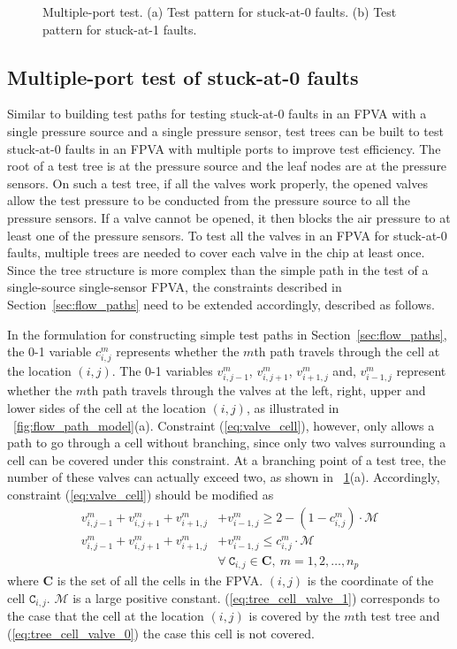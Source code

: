 \documentclass[journal,twoside]{IEEEtran}
\begin{document}
\begin{figure}
{\caption{Multiple-port test. (a) Test pattern for stuck-at-0 faults. (b) Test pattern for stuck-at-1 faults.}
\label{fig:multi_port_test_example}
}
\end{figure}


\subsection{Multiple-port test of stuck-at-0 faults}
\label{sec:multiple_port_tree}

Similar to building test paths for testing stuck-at-0 faults in an FPVA with
a single pressure source and a single pressure sensor, 
test trees can be built to test stuck-at-0 faults 
in an FPVA with multiple ports to improve test efficiency. 
The root of a test tree is at the pressure source and 
the leaf nodes are at the pressure sensors.
On such a test tree, if all the valves work properly, the opened
valves allow the test pressure to be conducted from the pressure source to 
all the pressure sensors. 
If a valve cannot be opened, it then blocks the air pressure to at least one of
the pressure sensors. 
To test all the valves in an FPVA for stuck-at-0 faults, 
multiple trees are needed to cover each valve in the chip at least once.
Since the tree structure is more complex than the simple path in the test of
a single-source single-sensor FPVA, the constraints described in
Section~\ref{sec:flow_paths} need to be extended accordingly, described as
follows.

In the formulation for constructing simple test paths  
in Section~\ref{sec:flow_paths}, the 0-1 variable $c^m_{i,j}$ represents
whether the $m$th path travels through the cell at the location $(i,j)$.  The
0-1 variables $v_{i, j-1}^m$, $v_{i, j+1}^m$, $v_{i+1, j}^m$ and, $v_{i-1,
j}^m$ represent whether the $m$th path travels through the valves at the left,
right, upper and lower sides of the cell at the location $(i,j)$, as
illustrated in \figname~\ref{fig:flow_path_model}(a). Constraint
(\ref{eq:valve_cell}), however, only allows a path to go through a cell without
branching, since only two valves surrounding a cell can be covered under this
constraint. At a branching point of a test tree, the number of these valves
can actually exceed two, as shown in
\figname~\ref{fig:multi_port_test_example}(a). Accordingly, constraint (\ref{eq:valve_cell}) 
should be modified as
\begin{align}\label{eq:tree_cell_valve_1}
v_{i, j-1}^m + v_{i, j+1}^m + v_{i+1, j}^m& + v_{i-1, j}^m \ge 2-(1-c^m_{i,j})\cdot\mathcal{M}  \\
\label{eq:tree_cell_valve_0}
v_{i, j-1}^m + v_{i, j+1}^m + v_{i+1, j}^m&+ v_{i-1, j}^m \le c^m_{i,j} \cdot\mathcal{M}  \\
 &\forall\ \mathtt{C}_{i,j}\in \mathbf{C}, \ m=1, 2,\dots, n_p\nonumber
\end{align}
where $\mathbf{C}$ is the set of all the cells in the FPVA.
$(i,j)$ is the coordinate of the cell $\mathtt{C}_{i,j}$.
$\mathcal{M}$ is a large positive constant.
(\ref{eq:tree_cell_valve_1}) 
corresponds to the case that the cell at the location $(i,j)$ is covered by the
$m$th test tree
and (\ref{eq:tree_cell_valve_0}) the case this cell is not covered.
\end{document}
